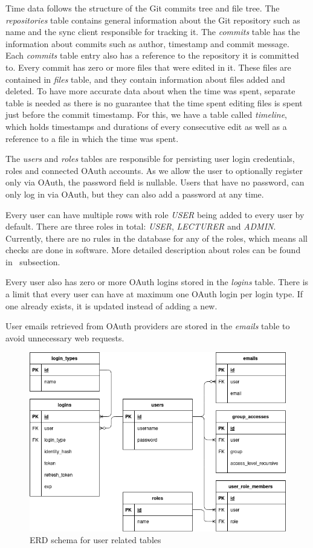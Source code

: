 Time data follows the structure of the Git commits tree and file tree.
The \textit{repositories} table contains general information about the Git repository such as name and the sync client
responsible for tracking it.
The \textit{commits} table has the information about commits such as author, timestamp and commit message.
Each \textit{commits} table entry also has a reference to the repository it is committed to.
Every commit has zero or more files that were edited in it.
These files are contained in \textit{files} table, and they contain information about files added and deleted.
To have more accurate data about when the time was spent, separate table is needed as there is no guarantee that
the time spent editing files is spent just before the commit timestamp.
For this, we have a table called \textit{timeline}, which holds timestamps and durations of every consecutive edit as
well as a reference to a file in which the time was spent.

The \textit{users} and \textit{roles} tables are responsible for persisting user login credentials, roles and connected OAuth accounts.
As we allow the user to optionally register only via OAuth, the password field is nullable.
Users that have no password, can only log in via OAuth, but they can also add a password at any time.

Every user can have multiple rows with role \textit{USER} being added to every user by default.
There are three roles in total: \textit{USER}, \textit{LECTURER} and \textit{ADMIN}.
Currently, there are no rules in the database for any of the roles, which means all checks are done in software.
More detailed description about roles can be found in~ subsection.

Every user also has zero or more OAuth logins stored in the \textit{logins} table.
There is a limit that every user can have at maximum one OAuth login per login type.
If one already exists, it is updated instead of adding a new.

User emails retrieved from OAuth providers are stored in the \textit{emails} table to avoid unnecessary web requests.

\begin{figure}[H]
    \includegraphics[width=\textwidth]{figures/erd_schema_user}
    \caption{ERD schema for user related tables}
    \label{fig:erd-schema-user}
\end{figure}

